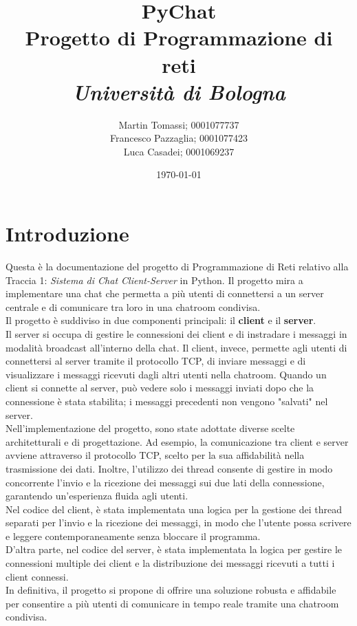 \documentclass[a4paper,12pt]{report}
\title{\textbf{PyChat}\\Progetto di Programmazione di reti\\\textit{Università di Bologna}}
\author{Martin Tomassi; 0001077737\\Francesco Pazzaglia; 0001077423\\Luca Casadei; 0001069237}
\date{\today}
\begin{document}
\maketitle
\tableofcontents

\chapter{Introduzione}
Questa è la documentazione del progetto di Programmazione di Reti relativo alla Traccia 1: \textit{Sistema di Chat Client-Server} in Python. Il progetto mira a implementare una chat che permetta a più utenti di connettersi a un server centrale e di comunicare tra loro in una chatroom condivisa.
\\
Il progetto è suddiviso in due componenti principali: il \textbf{client} e il \textbf{server}.
\\
Il server si occupa di gestire le connessioni dei client e di instradare i messaggi in modalità broadcast all'interno della chat. Il client, invece, permette agli utenti di connettersi al server tramite il protocollo TCP, di inviare messaggi e di visualizzare i messaggi ricevuti dagli altri utenti nella chatroom. Quando un client si connette al server, può vedere solo i messaggi inviati dopo che la connessione è stata stabilita; i messaggi precedenti non vengono "salvati" nel server.
\\
Nell'implementazione del progetto, sono state adottate diverse scelte architetturali e di progettazione. Ad esempio, la comunicazione tra client e server avviene attraverso il protocollo TCP, scelto per la sua affidabilità nella trasmissione dei dati. Inoltre, l'utilizzo dei thread consente di gestire in modo concorrente l'invio e la ricezione dei messaggi sui due lati della connessione, garantendo un'esperienza fluida agli utenti.
\\
Nel codice del client, è stata implementata una logica per la gestione dei thread separati per l'invio e la ricezione dei messaggi, in modo che l'utente possa scrivere e leggere contemporaneamente senza bloccare il programma. 
\\
D'altra parte, nel codice del server, è stata implementata la logica per gestire le connessioni multiple dei client e la distribuzione dei messaggi ricevuti a tutti i client connessi.
\\
In definitiva, il progetto si propone di offrire una soluzione robusta e affidabile per consentire a più utenti di comunicare in tempo reale tramite una chatroom condivisa.
\end{document}

